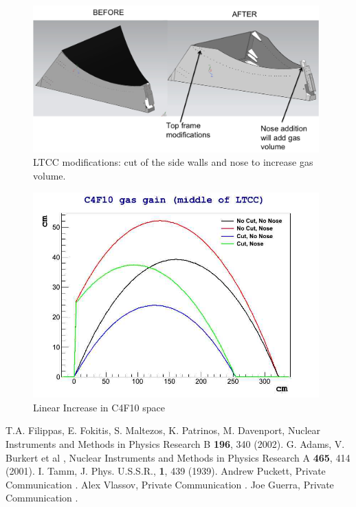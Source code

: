 \documentclass{article}
\begin{document}
\begin{figure}[ht]
	\centering
	\includegraphics[width=0.98\textwidth]{img/ltcc_mods.jpg}
	\caption{\scriptsize LTCC modifications: cut of the side walls and nose to increase gas volume.}
	\label{fig:mods}
\end{figure}


\begin{figure}[ht]
	\centering
	\includegraphics[width=0.98\textwidth]{img/window_addition_gain.jpg}
	\caption{\scriptsize Linear Increase in C4F10 space}
	\label{fig:window}
\end{figure}

\begin{thebibliography}{mybib}
     {T.A. Filippas, E. Fokitis, S. Maltezos, K. Patrinos, M. Davenport},   { Nuclear Instruments and Methods in Physics Research B        }        {\bf 196},             340   (2002).
     {G. Adams, V. Burkert et al },   { Nuclear Instruments and Methods in Physics Research A       }        {\bf 465},             414   (2001).
  {I. Tamm},   { J. Phys. U.S.S.R.,        }        {\bf 1},             439   (1939).
  {Andrew Puckett},   {Private Communication . } 
  {Alex Vlassov},   {Private Communication . } 
  {Joe Guerra},   {Private Communication . } 
\end{thebibliography}
\end{document}
